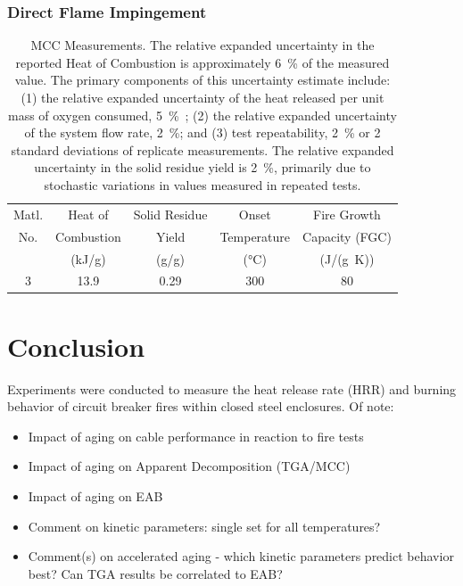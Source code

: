 \subsubsection{Direct Flame Impingement}


\begin{table}
	\caption[MCC Measurements]{MCC Measurements. The relative expanded uncertainty in the reported Heat of Combustion is approximately 6~\% of the measured value. The primary components of this uncertainty estimate include: (1) the relative expanded uncertainty of the heat released per unit mass of oxygen consumed, 5~\%~\cite{Huggett:1}; (2) the relative expanded uncertainty of the system flow rate, 2~\%; and (3) test repeatability, 2~\% or 2 standard deviations of replicate measurements. The relative expanded uncertainty in the solid residue yield is 2~\%, primarily due to stochastic variations in values measured in repeated tests.}
	\label{MCC}
	\begin{minipage}{\textwidth}
		\begin{tabular}{ccccc}
			\hline
			Matl.  & Heat of        & Solid Residue    & Onset              & Fire Growth             \\
			No.    & Combustion     & Yield            & Temperature        & Capacity (FGC)          \\
			& (kJ/g)         & (g/g)            & (°C)               & (J/(g~K))               \\ \hline
			3      &  13.9          & 0.29             & 300 & 80             \\
			\hline
		\end{tabular}
	\end{minipage}
\end{table}




\clearpage

\section{Conclusion}

Experiments were conducted to measure the heat release rate (HRR) and burning behavior of circuit breaker fires within closed steel enclosures. Of note:
\begin{itemize}
	\item Impact of aging on cable performance in reaction to fire tests
	\item Impact of aging on Apparent Decomposition (TGA/MCC)
	\item Impact of aging on EAB
	\item Comment on kinetic parameters: single set for all temperatures? 
	\item Comment(s) on accelerated aging - which kinetic parameters predict behavior best? Can TGA results be correlated to EAB?
\end{itemize}

